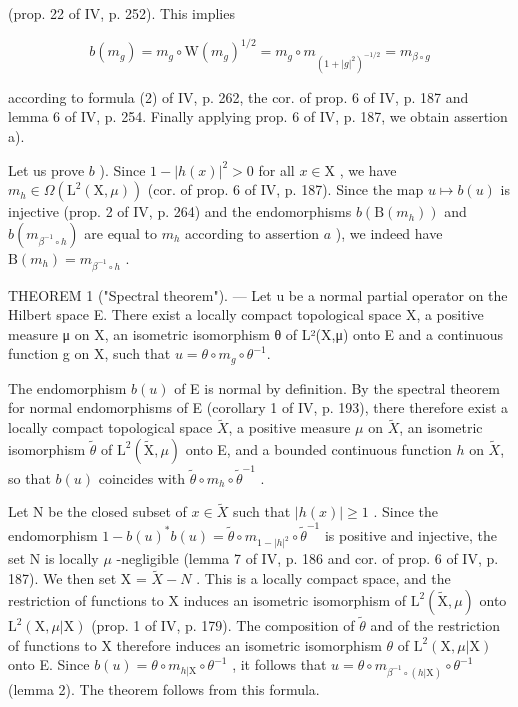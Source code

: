 (prop. 22 of IV, p. 252). This implies

\[
b (m _ {g}) = m _ {g} \circ \mathrm{W} (m _ {g}) ^ {1 / 2} = m _ {g} \circ m _ {(1 + | g | ^ {2}) ^ {- 1 / 2}} = m _ {\beta \circ g}
\]

according to formula (2) of IV, p. 262, the cor. of prop. 6 of IV, p. 187 and lemma 6 of IV, p. 254. Finally applying prop. 6 of IV, p. 187, we obtain assertion a).

Let us prove \(b\) ). Since \(1 - |h(x)|^2 > 0\) for all \(x \in \mathrm{X}\) , we have \(m_h \in \Omega(\mathrm{L}^2(\mathrm{X}, \mu))\) (cor. of prop. 6 of IV, p. 187). Since the map \(u \mapsto b(u)\) is injective (prop. 2 of IV, p. 264) and the endomorphisms \(b(\mathrm{B}(m_h))\) and \(b(m_{\beta^{-1}\circ h})\) are equal to \(m_h\) according to assertion \(a\) ), we indeed have \(\mathrm{B}(m_h) = m_{\beta^{-1}\circ h}\) .

THEOREM 1 ("Spectral theorem"). --- Let u be a normal partial operator on the Hilbert space E. There exist a locally compact topological space X, a positive measure μ on X, an isometric isomorphism θ of L²(X,μ) onto E and a continuous function g on X, such that \(u = \theta \circ m_g \circ \theta^{-1}\).

The endomorphism \(b(u)\) of E is normal by definition. By the spectral theorem for normal endomorphisms of E (corollary 1 of IV, p. 193), there therefore exist a locally compact topological space \(\widetilde{X}\), a positive measure \(\mu\) on \(\widetilde{X}\), an isometric isomorphism \(\widetilde{\theta}\) of \(\mathrm{L}^2 (\widetilde{\mathrm{X}},\mu)\) onto E, and a bounded continuous function \(h\) on \(\widetilde{X}\), so that \(b(u)\) coincides with \(\widetilde{\theta}\circ m_h\circ \widetilde{\theta}^{-1}\) .

Let N be the closed subset of \(x \in \widetilde{X}\) such that \(|h(x)| \geqslant 1\) . Since the endomorphism \(1 - b(u)^{*}b(u) = \widetilde{\theta} \circ m_{1-|h|^2} \circ \widetilde{\theta}^{-1}\) is positive and injective, the set N is locally \(\mu\) -negligible (lemma 7 of IV, p. 186 and cor. of prop. 6 of IV, p. 187). We then set X = \(\widetilde{X} - N\) . This is a locally compact space, and the restriction of functions to X induces an isometric isomorphism of \(\mathrm{L}^{2}(\widetilde{\mathrm{X}}, \mu)\) onto \(\mathrm{L}^{2}(\mathrm{X}, \mu|\mathrm{X})\) (prop. 1 of IV, p. 179). The composition of \(\widetilde{\theta}\) and of the restriction of functions to X therefore induces an isometric isomorphism \(\theta\) of \(\mathrm{L}^{2}(\mathrm{X}, \mu|\mathrm{X})\) onto E. Since \(b(u) = \theta \circ m_{h|\mathrm{X}} \circ \theta^{-1}\) , it follows that \(u = \theta \circ m_{\beta^{-1} \circ (h|\mathrm{X})} \circ \theta^{-1}\) (lemma 2). The theorem follows from this formula.


